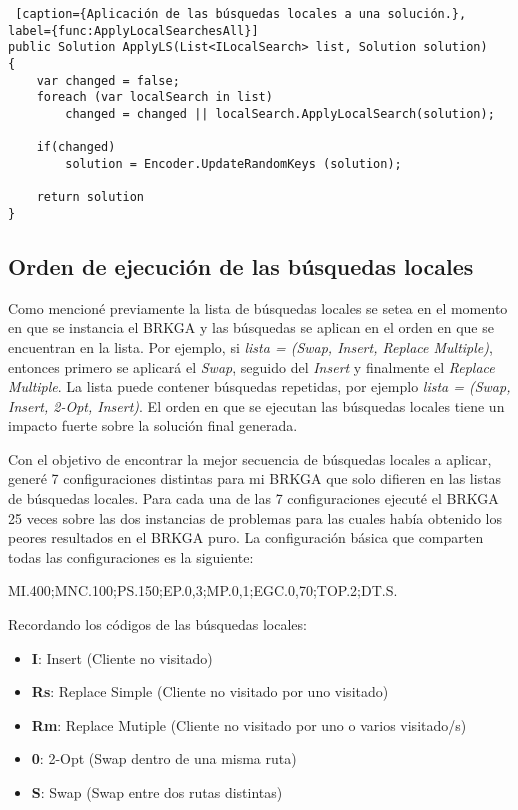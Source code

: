 \begin{minipage}{\textwidth}
\begin{lstlisting} [caption={Aplicación de las búsquedas locales a una solución.}, label={func:ApplyLocalSearchesAll}]
public Solution ApplyLS(List<ILocalSearch> list, Solution solution)
{	
	var changed = false;
	foreach (var localSearch in list)
		changed = changed || localSearch.ApplyLocalSearch(solution);

	if(changed)
		solution = Encoder.UpdateRandomKeys (solution);
	
	return solution
}
\end{lstlisting}
\end{minipage}

\subsection{Orden de ejecución de las búsquedas locales}

Como mencioné previamente la lista de búsquedas locales se setea en el momento en que se instancia el BRKGA y las búsquedas se aplican en el orden en que se encuentran en la lista. Por ejemplo, si \textit{lista = (Swap, Insert, Replace Multiple)}, entonces primero se aplicará el \textit{Swap}, seguido del \textit{Insert} y finalmente el \textit{Replace Multiple}. La lista puede contener búsquedas repetidas, por ejemplo \textit{lista = (Swap, Insert, 2-Opt, Insert)}. El orden en que se ejecutan las búsquedas locales tiene un impacto fuerte sobre la solución final generada.

\bigskip

Con el objetivo de encontrar la mejor secuencia de búsquedas locales a aplicar, generé 7 configuraciones distintas para mi BRKGA que solo difieren en las listas de búsquedas locales. Para cada una de las 7 configuraciones ejecuté el BRKGA 25 veces sobre las dos instancias de problemas para las cuales había obtenido los peores resultados en el BRKGA puro. La configuración básica que comparten todas las configuraciones es la siguiente: 

\bigskip

MI.400;MNC.100;PS.150;EP.0,3;MP.0,1;EGC.0,70;TOP.2;DT.S.

\bigskip

Recordando los códigos de las búsquedas locales: 
\begin{itemize}
  \item \textbf{I}: Insert (Cliente no visitado)
  \item \textbf{Rs}: Replace Simple (Cliente no visitado por uno visitado)
  \item \textbf{Rm}: Replace Mutiple (Cliente no visitado por uno o varios visitado/s)
  \item \textbf{0}: 2-Opt (Swap dentro de una misma ruta)
  \item \textbf{S}: Swap (Swap entre dos rutas distintas)
\end{itemize}


